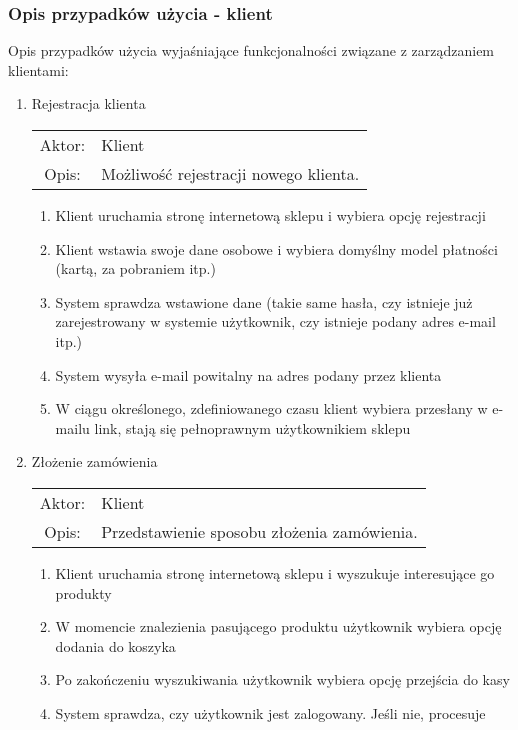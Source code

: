\subsubsection{Opis przypadków użycia - klient}

Opis przypadków użycia wyjaśniające funkcjonalności związane z zarządzaniem
klientami:

\begin{enumerate}
  \item Rejestracja klienta \\
  \begin{tabularx}{\linewidth}{ c X }
  Aktor: & Klient \\
  Opis: & Możliwość rejestracji nowego klienta.\\
  \end{tabularx}
   \begin{enumerate}
    \item Klient uruchamia stronę internetową sklepu i wybiera opcję rejestracji
    \item Klient wstawia swoje dane osobowe i wybiera domyślny model płatności
    (kartą, za pobraniem itp.)
    \item System sprawdza wstawione dane (takie same hasła, czy istnieje już
    zarejestrowany w systemie użytkownik, czy istnieje podany adres e-mail itp.)
    \item System wysyła e-mail powitalny na adres podany przez klienta
    \item W ciągu określonego, zdefiniowanego czasu klient wybiera przesłany w
    e-mailu link, stają się pełnoprawnym użytkownikiem sklepu
  \end{enumerate}
  \item Złożenie zamówienia \\
  \begin{tabularx}{\linewidth}{ c X }
  Aktor: & Klient \\
  Opis: & Przedstawienie sposobu złożenia zamówienia.\\
  \end{tabularx}
  \begin{enumerate}
    \item Klient uruchamia stronę internetową sklepu i wyszukuje interesujące go
    produkty
    \item W momencie znalezienia pasującego produktu użytkownik wybiera opcję
    dodania do koszyka
    \item Po zakończeniu wyszukiwania użytkownik wybiera opcję przejścia do kasy
    \item System sprawdza, czy użytkownik jest zalogowany. Jeśli nie, procesuje

\end{enumerate}
\end{enumerate}

